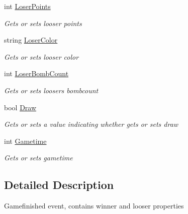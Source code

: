 \begin{DoxyCompactItemize}
int \mbox{\hyperlink{class_bomberman_1_1_business_logic_1_1_logic_classes_1_1_game_finished_event_args_a0e945308234e8390b91537103d13a19c}{Loser\+Points}}
\begin{DoxyCompactList}\small\item\em Gets or sets looser points \end{DoxyCompactList}\item 
string \mbox{\hyperlink{class_bomberman_1_1_business_logic_1_1_logic_classes_1_1_game_finished_event_args_a614b289f7ad9bd32f2f66942a802edb8}{Loser\+Color}}
\begin{DoxyCompactList}\small\item\em Gets or sets looser color \end{DoxyCompactList}\item 
int \mbox{\hyperlink{class_bomberman_1_1_business_logic_1_1_logic_classes_1_1_game_finished_event_args_ae783ef7cde8e9404126af769c55c463b}{Loser\+Bomb\+Count}}
\begin{DoxyCompactList}\small\item\em Gets or sets loosers bombcount \end{DoxyCompactList}\item 
bool \mbox{\hyperlink{class_bomberman_1_1_business_logic_1_1_logic_classes_1_1_game_finished_event_args_a8abef50e792970fe34574e223c925fcb}{Draw}}
\begin{DoxyCompactList}\small\item\em Gets or sets a value indicating whether gets or sets draw \end{DoxyCompactList}\item 
int \mbox{\hyperlink{class_bomberman_1_1_business_logic_1_1_logic_classes_1_1_game_finished_event_args_ab460997411b8d19d92f041bcc7cf0b26}{Gametime}}
\begin{DoxyCompactList}\small\item\em Gets or sets gametime \end{DoxyCompactList}\end{DoxyCompactItemize}


\subsection{Detailed Description}
Gamefinished event, contains winner and looser properties 



